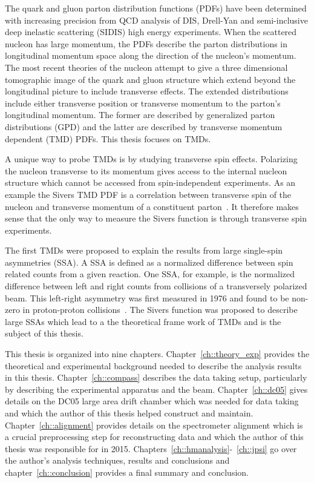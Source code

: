 The quark and gluon parton distribution functions (PDFs) have been determined
with increasing precision from QCD analysis of DIS, Drell-Yan and semi-inclusive
deep inelastic scattering (SIDIS) high energy experiments.  When the scattered
nucleon has large momentum, the PDFs describe the parton distributions in
longitudinal momentum space along the direction of the nucleon's momentum.  The
most recent theories of the nucleon attempt to give a three dimensional
tomographic image of the quark and gluon structure which extend beyond the
longitudinal picture to include transverse effects.  The extended distributions
include either transverse position or transverse momentum to the parton's
longitudinal momentum.  The former are described by generalized parton
distributions (GPD) and the latter are described by transverse momentum
dependent (TMD) PDFs.  This thesis focuses on TMDs.

A unique way to probe TMDs is by studying transverse spin effects.  Polarizing
the nucleon transverse to its momentum gives access to the internal nucleon
structure which cannot be accessed from spin-independent experiments.  As an
example the Sivers TMD PDF is a correlation between transverse spin of the
nucleon and transverse momentum of a constituent parton~\cite{Sivers}.  It
therefore makes sense that the only way to measure the Sivers function is
through transverse spin experiments.

The first TMDs were proposed to explain the results from large single-spin
asymmetries (SSA).  A SSA is defined as a normalized difference between spin
related counts from a given reaction.  One SSA, for example, is the normalized
difference between left and right counts from collisions of a transversely
polarized beam.  This left-right asymmetry was first measured in 1976 and found
to be non-zero in proton-proton collisions~\cite{PhysRevLett.36.929}.  The
Sivers function was proposed to describe large SSAs which lead to a the
theoretical frame work of TMDs and is the subject of this thesis.

This thesis is organized into nine chapters.  Chapter~\ref{ch::theory_exp}
provides the theoretical and experimental background needed to describe the
analysis results in this thesis.  Chapter~\ref{ch::compass} describes the data
taking setup, particularly by describing the experimental apparatus and the
beam.  Chapter~\ref{ch::dc05} gives details on the DC05 large area drift chamber
which was needed for data taking and which the author of this thesis helped
construct and maintain.  Chapter~\ref{ch::alignment} provides details on the
spectrometer alignment which is a crucial preprocessing step for reconstructing
data and which the author of this thesis was responsible for in 2015.
Chapters~\ref{ch::hmanalysis}-~\ref{ch::jpsi} go over the author's analysis
techniques, results and conclusions and chapter~\ref{ch::conclusion} provides a
final summary and conclusion.
